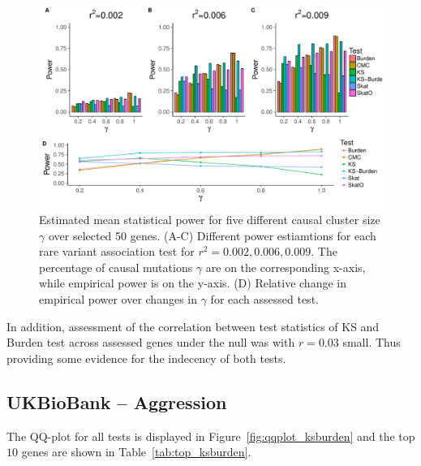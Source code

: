 \begin{figure}[ht!]
  \centering
  \includegraphics[width=0.8\linewidth]{figures/combined_power_analysis.pdf}
  \caption{Estimated mean statistical power for five different causal cluster size $\gamma$ over selected 50 genes.
    (A-C) Different power estiamtions for each rare variant association test for $r^2=0.002, 0.006, 0.009$.
    The percentage of causal mutations $\gamma$ are on the corresponding x-axis, while empirical power is on the y-axis.
    (D) Relative change in empirical power over changes in $\gamma$ for each assessed test.\label{fig:simulatedGeneRealData}}
\end{figure}

In addition, assessment of the correlation between test statistics of KS and Burden test across assessed genes under the null was with $r=0.03$ small.
Thus providing some evidence for the indecency of both tests. %

\subsection{UKBioBank -- Aggression}
\label{sub:ukbiobank_aggression}

The QQ-plot for all tests is displayed in Figure~\ref{fig:qqplot_ksburden} and the top $10$ genes are shown in Table~\ref{tab:top_ksburden}.
